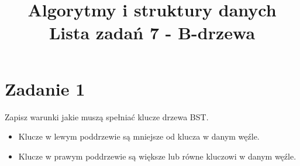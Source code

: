 \documentclass{article}
\title {
    \Huge\textbf{Algorytmy i struktury danych} \\
    \vspace{2mm}
    \huge{Lista zadań 7 - B-drzewa} 
    \date{}
}
\begin{document}
    \maketitle
    \boldmath
    \section*{Zadanie 1}
        Zapisz warunki jakie muszą spełniać klucze drzewa BST.
        \begin{itemize}
            \item Klucze w lewym poddrzewie są mniejsze od klucza w danym węźle.
            \item Klucze w prawym poddrzewie są większe lub równe kluczowi w danym węźle.
        \end{itemize}
    
\end{document}
